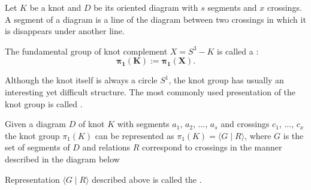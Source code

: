 Let $K$ be a knot and $D$ be its oriented diagram with $s$ segments and $x$ crossings. 
A segment of a diagram is a line of the diagram between two crossings in which it is disappears under another line.

\begin{definition} 
  The fundamental group of knot complement $X=S^3-K$  is called a :
  \boldmath$$\mathbf{\pi_1(K):=\pi_1(X)}.
  $$
\end{definition}
Although the knot itself is always a circle $S^1$, the knot group has usually an interesting yet difficult structure. The most commonly used presentation of the knot group is called .

\begin{definition}
  Given a diagram $D$ of knot $K$ with segments $a_1$, $a_2$, ..., $a_s$ and crossings $c_1$, ..., $c_x$ the knot group $\pi_1(K)$ can be represented as $\pi_1(K)=\langle G\;|\;R\rangle$, where $G$ is the set of segments of $D$ and relations $R$ correspond to crossings in the manner described in the diagram below
  \begin{center}
  \end{center}
  Representation $\langle G\;|\;R\rangle$ described above is called the  \cite[Chapter~6]{livingstone}.
\end{definition}

